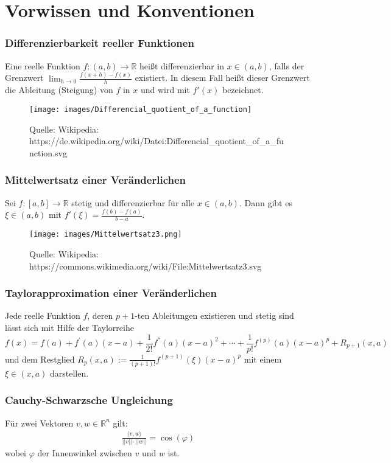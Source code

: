 
\section{Vorwissen und Konventionen}

\subsubsection*{Differenzierbarkeit reeller Funktionen} 
Eine reelle Funktion $f : (a, b) \to \mathbb{R}$  heißt differenzierbar in $x \in (a,b)$, falls der Grenzwert $\lim_{h \to 0}  \frac{f(x +h) - f(x)}  {h}$ existiert. In diesem Fall heißt dieser Grenzwert die Ableitung (Steigung) von $f$ in $x$ und wird mit $f' (x)$ bezeichnet.
\begin{figure}[H]
      \centering
    \texttt{[image: images/Differencial\_quotient\_of\_a\_function]}
      \caption{Quelle: Wikipedia: https://de.wikipedia.org/wiki/Datei:Differencial\_quotient\_of\_a\_function.svg}
\end{figure}

\subsubsection*{Mittelwertsatz einer Veränderlichen} 

Sei $f : [a,b] \to \mathbb{R}$ stetig und differenzierbar für alle $x \in (a,b)$. Dann gibt es $\xi \in (a,b)$ mit
$f'(\xi) = \frac{f(b) - f(a)} { b-a}$.
\begin{figure}[H]
      \centering
    \texttt{[image: images/Mittelwertsatz3.png]}
      \caption{Quelle: Wikipedia: https://commons.wikimedia.org/wiki/File:Mittelwertsatz3.svg}
\end{figure}

\subsubsection*{Taylorapproximation einer Veränderlichen} 

Jede  reelle Funktion $f$, deren $p+1$-ten Ableitungen existieren und stetig sind lässt sich mit Hilfe der Taylorreihe  $$f(x) = f(a) + f^{'}(a) (x-a) +   \frac{1}{2!} f^{''}(a) (x-a)^2 + \cdots  +  \frac{1}{p!} f^{(p)}(a) (x-a)^{p} +  R_{p+1}(x,a) $$
und dem Restglied  $R_p(x,a) :=   \frac{1}{(p+1)!} f^{(p+1)}(\xi) (x-a)^{p} $ mit einem $\xi \in (x,a)$ darstellen.


\subsubsection*{Cauchy-Schwarzsche Ungleichung}
 Für zwei Vektoren $v,w \in \mathbb{R}^n$ gilt: 
\begin{align*}
\frac{\langle v, w \rangle}{||v|| \cdot ||w||} = \cos(\varphi) 
\end{align*}
wobei $\varphi$ der Innenwinkel zwischen $v$ und $w$ ist.


